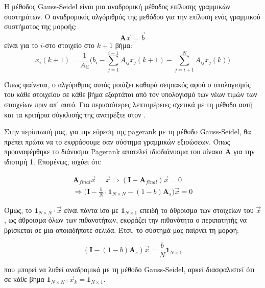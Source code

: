 H μέθοδος Gauss-Seidel είναι μια αναδρομική μέθοδος επίλυσης γραμμικών συστημάτων. Ο αναδρομικός αλγόριθμός της μεθόδου για την επίλυση ενός γραμμικού συστήματος της μορφής:
$$\bm{A}\vec{x}=\vec{b}$$
είναι για το $i$-στο στοιχείο στο $k+1$ βήμα:
$$x_i(k+1) = \frac{1}{A_{ii}}\bigg(b_i-\sum_{j=1}^{i-1}A_{ij}x_j(k+1)-\sum_{j=i+1}^{N}A_{ij}x_j(k)\bigg)$$

Όπως φαίνεται, ο αλγόριθμος αυτός μοιάζει καθαρά σειριακός αφού ο υπολογισμός του κάθε στοιχείου σε κάθε βήμα εξαρτάται από τον υπολογισμό των νέων τιμών των στοιχείων πριν απ' αυτό.
Για περισσότερες λεπτομέρειες σχετικά με τη μέθοδο αυτή και τα κριτήρια σύγκλισής της ανατρέξτε στον \textcite{saad2003iterative}.

Στην περίπτωσή μας, για την εύρεση της pagerank με τη μέθοδο Gauss-Seidel, θα πρέπει πρώτα να το εκφράσουμε σαν σύστημα γραμμικών εξισώσεων. Όπως προαναφέρθηκε το διάνυσμα Pagerank αποτελεί ιδιοδιάνυσμα του πίνακα $\bm{A}$ για την ιδιοτιμή 1. Επομένως, ισχύει ότι:

\begin{gather*}
\bm{A}_{final}\vec{x} = \vec{x}\Rightarrow (\bm{I}-\bm{A}_{final})\vec{x} = 0 \\
\Rightarrow \bigg(\bm{I}-\frac{b}{N}\cdot\bm{1}_{N\times N}-(1-b)\bm{A}_s\bigg)\vec{x} = 0
\end{gather*}

Όμως, το $\bm{1}_{N\times N}\cdot\vec{x}$ είναι πάντα ίσο με $\bm{1}_{N\times1}$ επειδή το άθροισμα των στοιχείων του $\vec{x}$, ως άθροισμα όλων των πιθανοτήτων, εκφράζει την πιθανότητα ο περιπατητής να βρίσκεται σε μια οποιαδήποτε σελίδα. Έτσι, το σύστημά μας παίρνει τη μορφή:

$$(\bm{I}-(1-b)\bm{A}_s)\vec{x} = \frac{b}{N}\bm{1}_{N\times1}$$

που μπορεί να λυθεί αναδρομικά με τη μέθοδο Gauss-Seidel, αρκεί διασφαλιστεί ότι σε κάθε βήμα $\bm{1}_{N\times N}\cdot\vec{x}_k =\bm{1}_{N\times1}$.
